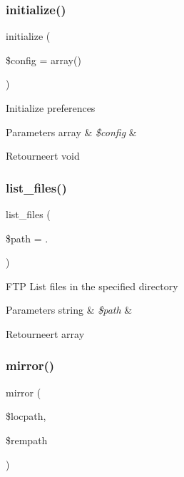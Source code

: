 \subsubsection{\texorpdfstring{initialize()}{initialize()}}
{\footnotesize\ttfamily initialize (\begin{DoxyParamCaption}\item[{}]{\$config = {\ttfamily array()} }\end{DoxyParamCaption})}

Initialize preferences


\begin{DoxyParams}[1]{Parameters}
array & {\em \$config} & \\
\hline
\end{DoxyParams}
\begin{DoxyReturn}{Retourneert}
void 
\end{DoxyReturn}
\mbox{\label{class_c_i___f_t_p_a2a40473caefcd36b60e3e96b3395975c}} 
\subsubsection{\texorpdfstring{list\_files()}{list\_files()}}
{\footnotesize\ttfamily list\+\_\+files (\begin{DoxyParamCaption}\item[{}]{\$path = {\ttfamily \textquotesingle{}.\textquotesingle{}} }\end{DoxyParamCaption})}

F\+TP List files in the specified directory


\begin{DoxyParams}[1]{Parameters}
string & {\em \$path} & \\
\hline
\end{DoxyParams}
\begin{DoxyReturn}{Retourneert}
array 
\end{DoxyReturn}
\mbox{\label{class_c_i___f_t_p_aea2de30bbdf050cb607bbc5a36772bf3}} 
\subsubsection{\texorpdfstring{mirror()}{mirror()}}
{\footnotesize\ttfamily mirror (\begin{DoxyParamCaption}\item[{}]{\$locpath,  }\item[{}]{\$rempath }\end{DoxyParamCaption})}

